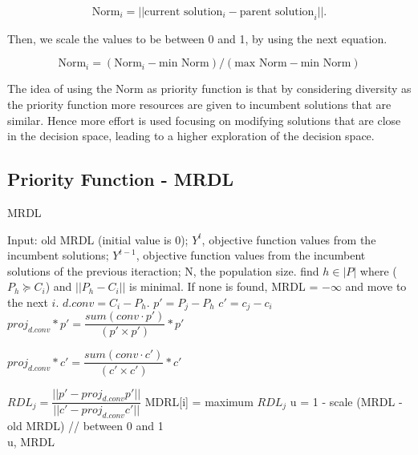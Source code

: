 \begin{equation}
 \text{Norm}_i = ||\text{current solution}_i - \text{parent solution}_i||.
\end{equation}

Then, we scale the values to be between 0 and 1, by using the next equation.

\begin{equation}\label{scaling}
 \text{Norm}_i = (\text{Norm}_i - \text{min  Norm}) / (\text{max Norm} - \text{min Norm})
\end{equation}

The idea of using the Norm as priority function is that by considering diversity as the priority function more resources are given to incumbent solutions that are similar. Hence more effort is used focusing on modifying solutions that are close in the decision space, leading to a higher exploration of the decision space.


\subsection{Priority Function - MRDL} 


\begin{algorithm}[t]
	\caption{MRDL}\label{alg2}
	\begin{algorithmic}[1]
		
		\State Input: old MRDL (initial value is 0); $Y^t$, objective function values from the incumbent solutions; $Y^{t-1}$, objective function values from the incumbent solutions of the previous iteraction; N, the population size.
		\State find $h \in |P|$ where  ($P_h \succeq C_i$) and $||P_h - C_i  ||$ is minimal.
		\State If none is found, MRDL = $-\infty$ and move to the next $i$.
		\State $d.conv = C_i - P_h$.
		\State $p \prime = P_j - P_h$
		\State $c \prime = c_j - c_i$
		\State $proj_{d.conv}*p \prime = \dfrac{sum(conv \cdot p \prime)}{(p \prime \times p \prime)}*p \prime$
		
		\State $ proj_{d.conv}*c \prime = \dfrac{sum(conv \cdot c \prime)}{(c \prime \times c \prime)}*c \prime$
		
		\State $RDL_j = \dfrac{ ||p \prime - proj_{d.conv}p \prime|| }{||c \prime - proj_{d.conv}c \prime||}            $
		\EndFor
		MDRL[i] = maximum $RDL_j$
		\EndFor
		\State u = 1 - scale (MRDL - old MRDL) // between 0 and 1\\
	\Return u, MRDL
	\end{algorithmic}
\end{algorithm}


